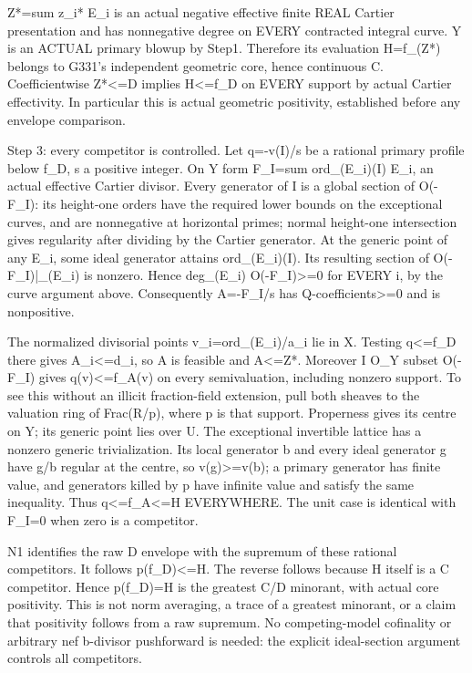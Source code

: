 Z*=sum z\_i* E\_i is an actual negative effective finite REAL Cartier presentation and has nonnegative degree on EVERY contracted integral curve. Y is an ACTUAL primary blowup by Step1. Therefore its evaluation H=f\_(Z*) belongs to G331's independent geometric core, hence continuous C. Coefficientwise Z*<=D implies H<=f\_D on EVERY support by actual Cartier effectivity. In particular this is actual geometric positivity, established before any envelope comparison.

Step 3: every competitor is controlled. Let q=-v(I)/s be a rational primary profile below f\_D, s a positive integer. On Y form F\_I=sum ord\_(E\_i)(I) E\_i, an actual effective Cartier divisor. Every generator of I is a global section of O(-F\_I): its height-one orders have the required lower bounds on the exceptional curves, and are nonnegative at horizontal primes; normal height-one intersection gives regularity after dividing by the Cartier generator. At the generic point of any E\_i, some ideal generator attains ord\_(E\_i)(I). Its resulting section of O(-F\_I)|\_(E\_i) is nonzero. Hence deg\_(E\_i) O(-F\_I)>=0 for EVERY i, by the curve argument above. Consequently A=-F\_I/s has Q-coefficients>=0 and is nonpositive.

The normalized divisorial points v\_i=ord\_(E\_i)/a\_i lie in X. Testing q<=f\_D there gives A\_i<=d\_i, so A is feasible and A<=Z*. Moreover I O\_Y subset O(-F\_I) gives q(v)<=f\_A(v) on every semivaluation, including nonzero support. To see this without an illicit fraction-field extension, pull both sheaves to the valuation ring of Frac(R/p), where p is that support. Properness gives its centre on Y; its generic point lies over U. The exceptional invertible lattice has a nonzero generic trivialization. Its local generator b and every ideal generator g have g/b regular at the centre, so v(g)>=v(b); a primary generator has finite value, and generators killed by p have infinite value and satisfy the same inequality. Thus q<=f\_A<=H EVERYWHERE. The unit case is identical with F\_I=0 when zero is a competitor.

N1 identifies the raw D envelope with the supremum of these rational competitors. It follows p(f\_D)<=H. The reverse follows because H itself is a C competitor. Hence p(f\_D)=H is the greatest C/D minorant, with actual core positivity. This is not norm averaging, a trace of a greatest minorant, or a claim that positivity follows from a raw supremum. No competing-model cofinality or arbitrary nef b-divisor pushforward is needed: the explicit ideal-section argument controls all competitors.

